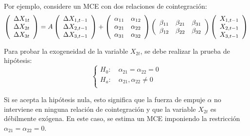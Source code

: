 Por ejemplo, considere un MCE con dos relaciones de cointegraci\'{o}n:
\[
\left( {\begin{array}{*{20}c}
\Delta X_{1t}\\
\Delta X_{2t}\\
\Delta X_{3t}\\
\end{array} } \right)=A\left( {\begin{array}{*{20}c}
\Delta X_{1,t-1}\\
\Delta X_{2,t-1}\\
\Delta X_{3,t-1}\\
\end{array} } \right)+\left( {\begin{array}{*{20}c}
\alpha_{11} & \alpha_{12}\\
\alpha_{21} & \alpha_{22}\\
\alpha_{31} & \alpha_{32}\\
\end{array} } \right)\left( {\begin{array}{*{20}c}
\beta_{11} & \beta_{21} & \beta_{31}\\
\beta_{12} & \beta_{22} & \beta_{32}\\
\end{array} } \right)\left( {\begin{array}{*{20}c}
X_{1,t-1}\\
X_{2,t-1}\\
X_{3,t-1}\\
\end{array} } \right)
\]

Para probar la exogeneidad de la variable $X_{2t}$, se debe realizar la 
prueba de hip\'{o}tesis:
\[
\left\{ {\begin{array}{l}
 H_{0}:\quad \alpha_{21}=\alpha_{22}=0 \\ 
 H_{a}:\quad \alpha_{21},\alpha_{22}\ne 0\\ 
 \end{array}} \right.
\]

Si se acepta la hip\'{o}tesis nula, esto significa que la fuerza de empuje $\alpha $ no interviene en ninguna relaci\'{o}n de cointegraci\'{o}n y que la variable $X_{2t}$ es d\'{e}bilmente ex\'{o}gena. En este caso, se estima un MCE imponiendo la restricci\'{o}n $\alpha_{21}=\alpha_{22}=0$.

